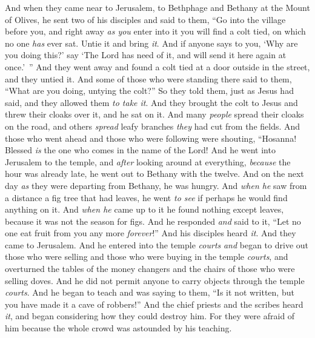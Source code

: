 \begin{biblechapter} %
 And when they came near to Jerusalem, to Bethphage and Bethany at the Mount of Olives, he sent two of his disciples
\verse and said to them, “Go into the village before you, and right away \textit{as you} enter into it you will find a colt tied, on which no one \textit{has} ever sat. Untie it and bring \textit{it}.
\verse And if anyone says to you, ‘Why are you doing this?’ say ‘The Lord has need of it, and will send it here again at once.’ ”
\verse And they went away and found a colt tied at a door outside in the street, and they untied it.
\verse And some of those who were standing there said to them, “What are you doing, untying the colt?”
\verse So they told them, just as Jesus had said, and they allowed them \textit{to take it}.
\verse And they brought the colt to Jesus and threw their cloaks over it, and he sat on it.
\verse And many \textit{people} spread their cloaks on the road, and others \textit{spread} leafy branches \textit{they} had cut from the fields.
\verse And those who went ahead and those who were following were shouting,
\verse “Hosanna! 
Blessed \textit{is} the one who comes in the name of the Lord!
\verse And he went into Jerusalem to the temple, and \textit{after} looking around at everything, \textit{because} the hour was already late, he went out to Bethany with the twelve.
 And on the next day \textit{as} they were departing from Bethany, he was hungry.
\verse And \textit{when he} saw from a distance a fig tree that had leaves, he went \textit{to see} if perhaps he would find anything on it. And \textit{when he} came up to it he found nothing except leaves, because it was not the season for figs.
\verse And he responded \textit{and} said to it, “Let no one eat fruit from you any more \textit{forever}!” And his disciples heard \textit{it}.
 And they came to Jerusalem. And he entered into the temple \textit{courts} \textit{and} began to drive out those who were selling and those who were buying in the temple \textit{courts}, and overturned the tables of the money changers and the chairs of those who were selling doves.
\verse And he did not permit anyone to carry objects through the temple \textit{courts}.
\verse And he began to teach and was saying to them, “Is it not written,
\verse but you have made it a cave of robbers!”
\verse And the chief priests and the scribes heard \textit{it}, and began considering how they could destroy him. For they were afraid of him because the whole crowd was astounded by his teaching.

\end{biblechapter}
